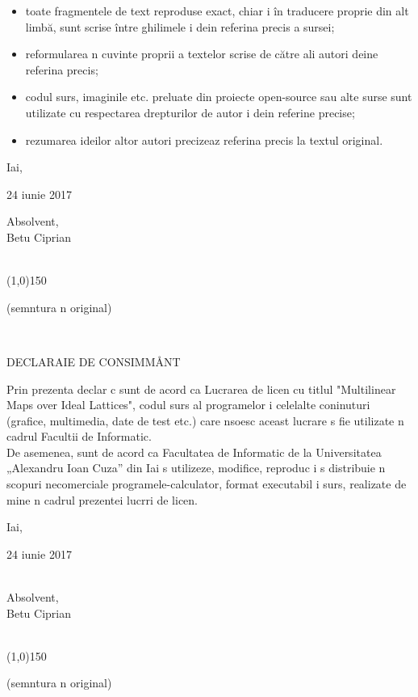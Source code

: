 \begin{itemize}
	\item toate fragmentele de text reproduse exact, chiar \sh i în traducere proprie din alt{\ua} limbă, sunt scrise între ghilimele \sh i de\tz in referin\tz a precis{\ua} a sursei;
	\item reformularea \ii n cuvinte proprii a textelor scrise de către al\tz i autori de\tz ine referin\tz a precis\ua ;
	\item codul surs\ua , imaginile etc. preluate din proiecte open-source sau alte surse sunt utilizate cu respectarea drepturilor de autor \sh i de\tz in referin\tz e precise; 
	\item rezumarea ideilor altor autori precizeaz{\ua} referin\tz a precis{\ua} la textul original.
	
\end{itemize}

\vspace{10mm}

Ia\sh i,
\

24 iunie 2017
\

\begin{flushright}
	Absolvent,
	\\
	
	B\ua etu Ciprian
	\\
	\
	\
	
	\line(1,0){150}
	\
	
	(semn\ua tura \ii n original)
\end{flushright}

\newpage

\

\vspace{20mm}
\begin{large}
	\begin{center}
		DECLARA\Tz IE DE CONSIM\Tz \uA M\AA NT
	\end{center}
\end{large}

\vspace{30mm}

Prin prezenta declar c{\ua} sunt de acord ca Lucrarea de licen\tz{\ua} cu titlul "Multilinear Maps over Ideal Lattices", codul surs{\ua} al programelor \sh i celelalte con\tz inuturi (grafice, multimedia, date de test etc.) care \ii nso\tz esc aceast{\ua} lucrare s{\ua} fie utilizate \ii n cadrul \mbox{Facult\ua \tz ii} de Informatic\ua.
\\

De asemenea, sunt de acord ca Facultatea de Informatic{\ua} de la Universitatea „Alexandru Ioan Cuza” din Ia\sh i s{\ua} utilizeze, modifice, reproduc{\ua} \sh i s{\ua} distribuie \ii n scopuri necomerciale programele-calculator, format executabil \sh i surs\ua, realizate de mine \ii n cadrul prezentei lucr\ua ri de licen\tz \ua.

\vspace{20mm}

Ia\sh i,
\

24 iunie 2017
\\
\

\begin{flushright}
	Absolvent,
	\\
	
	B\ua etu Ciprian
	\\
	\
	\
	
	\line(1,0){150}
	\
	
	(semn\ua tura \ii n original)
\end{flushright}
\newpage
